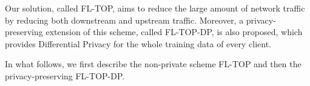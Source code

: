 \documentclass[accepted]{uai2021} %
\newcommand{\TOPK}{Top-$K$\xspace}
\begin{document}
Our solution, called FL-TOP, aims to reduce the large amount of network traffic by reducing both downstream and upstream traffic. Moreover, a privacy-preserving extension of this scheme, called FL-TOP-DP, is also proposed, which provides Differential Privacy for the whole training data of every client. %

    


In what follows, we first describe the non-private scheme FL-TOP and then the privacy-preserving FL-TOP-DP. 

\end{document}
